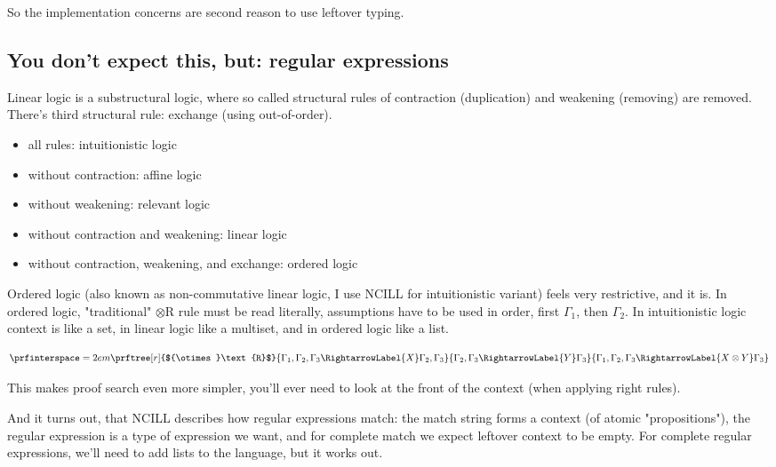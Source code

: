 \documentclass{article}
\begin{document}
So the implementation concerns are second reason to use leftover typing.

\subsection{You don't expect this, but: regular expressions}

Linear logic is a substructural logic, where so called structural rules
of contraction (duplication) and weakening (removing) are removed.
There's third structural rule: exchange (using out-of-order).

\begin{itemize}
  \item all rules: intuitionistic logic
  \item without contraction: affine logic
  \item without weakening: relevant logic
  \item without contraction and weakening: linear logic
  \item without contraction, weakening, and exchange: ordered logic
\end{itemize}

Ordered logic (also known as non-commutative linear logic, I use NCILL for intuitionistic variant)
feels very restrictive, and it is. In ordered logic,
"traditional" ${\otimes}\text{R}$ rule must be read literally,
assumptions have to be used in order, first $\Gamma_1$, then $\Gamma_2$.
In intuitionistic logic context is like a set, in linear logic
like a multiset, and in ordered logic like a list.

\begin{equation*}
\prfinterspace=2em
\prftree[r]{${\otimes}\text{R}$}
{\Gamma_1, \Gamma_2, \Gamma_3 \RightarrowLabel{X} \Gamma_2, \Gamma_3}
{\Gamma_2, \Gamma_3 \RightarrowLabel{Y} \Gamma_3}
{\Gamma_1, \Gamma_2, \Gamma_3 \RightarrowLabel{X \otimes Y} \Gamma_3}
\end{equation*}

This makes proof search even more simpler, you'll ever need to look at the
front of the context (when applying right rules).

And it turns out, that NCILL describes how regular expressions match:
the match string forms a context (of atomic "propositions"), the regular expression
is a type of expression we want, and for complete match we expect
leftover context to be empty. For complete regular expressions, we'll
need to add lists to the language, but it works out.
\end{document}
